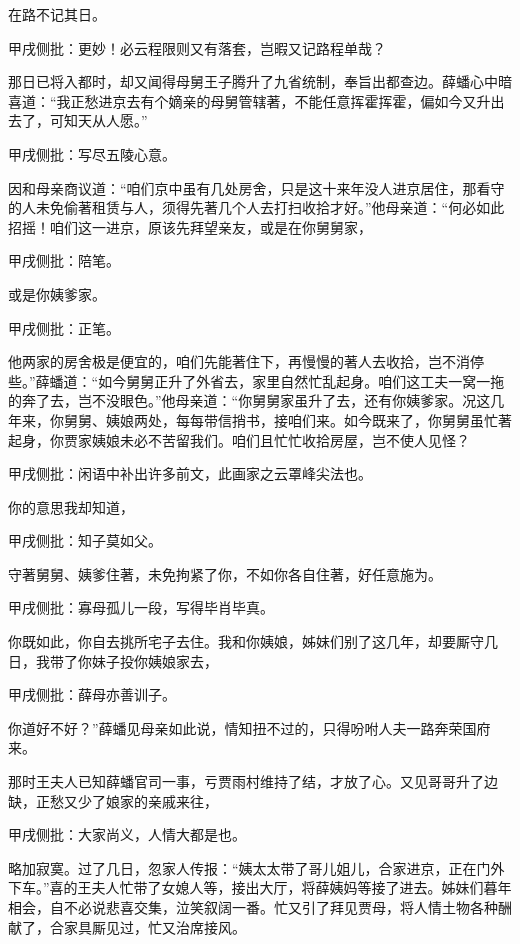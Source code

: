 \begin{parag}
    在路不记其日。\begin{note}甲戌侧批：更妙！必云程限则又有落套，岂暇又记路程单哉？\end{note}那日已将入都时，却又闻得母舅王子腾升了九省统制，奉旨出都查边。薛蟠心中暗喜道：“我正愁进京去有个嫡亲的母舅管辖著，不能任意挥霍挥霍，偏如今又升出去了，可知天从人愿。”\begin{note}甲戌侧批：写尽五陵心意。\end{note}因和母亲商议道：“咱们京中虽有几处房舍，只是这十来年没人进京居住，那看守的人未免偷著租赁与人，须得先著几个人去打扫收拾才好。”他母亲道：“何必如此招摇！咱们这一进京，原该先拜望亲友，或是在你舅舅家，\begin{note}甲戌侧批：陪笔。\end{note}或是你姨爹家。\begin{note}甲戌侧批：正笔。\end{note}他两家的房舍极是便宜的，咱们先能著住下，再慢慢的著人去收拾，岂不消停些。”薛蟠道：“如今舅舅正升了外省去，家里自然忙乱起身。咱们这工夫一窝一拖的奔了去，岂不没眼色。”他母亲道：“你舅舅家虽升了去，还有你姨爹家。况这几年来，你舅舅、姨娘两处，每每带信捎书，接咱们来。如今既来了，你舅舅虽忙著起身，你贾家姨娘未必不苦留我们。咱们且忙忙收拾房屋，岂不使人见怪？\begin{note}甲戌侧批：闲语中补出许多前文，此画家之云罩峰尖法也。\end{note}你的意思我却知道，\begin{note}甲戌侧批：知子莫如父。\end{note}守著舅舅、姨爹住著，未免拘紧了你，不如你各自住著，好任意施为。\begin{note}甲戌侧批：寡母孤儿一段，写得毕肖毕真。\end{note}你既如此，你自去挑所宅子去住。我和你姨娘，姊妹们别了这几年，却要厮守几日，我带了你妹子投你姨娘家去，\begin{note}甲戌侧批：薛母亦善训子。\end{note}你道好不好？”薛蟠见母亲如此说，情知扭不过的，只得吩咐人夫一路奔荣国府来。
\end{parag}


\begin{parag}
    那时王夫人已知薛蟠官司一事，亏贾雨村维持了结，才放了心。又见哥哥升了边缺，正愁又少了娘家的亲戚来往，\begin{note}甲戌侧批：大家尚义，人情大都是也。\end{note}略加寂寞。过了几日，忽家人传报：“姨太太带了哥儿姐儿，合家进京，正在门外下车。”喜的王夫人忙带了女媳人等，接出大厅，将薛姨妈等接了进去。姊妹们暮年相会，自不必说悲喜交集，泣笑叙阔一番。忙又引了拜见贾母，将人情土物各种酬献了，合家具厮见过，忙又治席接风。
\end{parag}



